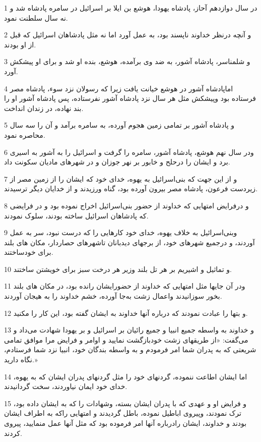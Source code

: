 \par 1 در سال دوازدهم آحاز، پادشاه یهودا، هوشع بن ایلا بر اسرائیل در سامره پادشاه شد و نه سال سلطنت نمود.
\par 2 و آنچه درنظر خداوند ناپسند بود، به عمل آورد اما نه مثل پادشاهان اسرائیل که قبل از او بودند.
\par 3 و شلمناسر، پادشاه آشور، به ضد وی برآمده، هوشع، بنده او شد و برای او پیشکش آورد.
\par 4 اماپادشاه آشور در هوشع خیانت یافت زیرا که رسولان نزد سوء، پادشاه مصر فرستاده بود وپیشکش مثل هر سال نزد پادشاه آشور نفرستاده، پس پادشاه آشور او را بند نهاده، در زندان انداخت.
\par 5 و پادشاه آشور بر تمامی زمین هجوم آورده، به سامره برآمد و آن را سه سال محاصره نمود.
\par 6 ودر سال نهم هوشع، پادشاه آشور، سامره را گرفت و اسرائیل را به آشور به اسیری برد و ایشان را درحلح و خابور بر نهر جوزان و در شهرهای مادیان سکونت داد.
\par 7 و از این جهت که بنی‌اسرائیل به یهوه، خدای خود که ایشان را از زمین مصر از زیردست فرعون، پادشاه مصر بیرون آورده بود، گناه ورزیدند و از خدایان دیگر ترسیدند.
\par 8 و درفرایض امتهایی که خداوند از حضور بنی‌اسرائیل اخراج نموده بود و در فرایضی که پادشاهان اسرائیل ساخته بودند، سلوک نمودند.
\par 9 وبنی‌اسرائیل به خلاف یهوه، خدای خود کارهایی را که درست نبود، سر به عمل آوردند، و درجمیع شهرهای خود، از برجهای دیدبانان تاشهرهای حصاردار، مکان های بلند برای خودساختند.
\par 10 و تماثیل و اشیریم بر هر تل بلند وزیر هر درخت سبز برای خویشتن ساختند.
\par 11 ودر آن جایها مثل امتهایی که خداوند از حضورایشان رانده بود، در مکان های بلند بخور سوزانیدند واعمال زشت به‌جا آورده، خشم خداوند را به هیجان آوردند.
\par 12 و بتها را عبادت نمودند که درباره آنها خداوند به ایشان گفته بود، این کار را مکنید.
\par 13 و خداوند به واسطه جمیع انبیا و جمیع رائیان بر اسرائیل و بر یهودا شهادت می‌داد و می‌گفت: «از طریقهای زشت خودبازگشت نمایید و اوامر و فرایض مرا موافق تمامی شریعتی که به پدران شما امر فرمودم و به واسطه بندگان خود، انبیا نزد شما فرستادم، نگاه دارید.»
\par 14 اما ایشان اطاعت ننموده، گردنهای خود را مثل گردنهای پدران ایشان که به یهوه، خدای خود ایمان نیاوردند، سخت گردانیدند.
\par 15 و فرایض او و عهدی که با پدران ایشان بسته، وشهادات را که به ایشان داده بود، ترک نمودند، وپیروی اباطیل نموده، باطل گردیدند و امتهایی راکه به اطراف ایشان بودند و خداوند، ایشان رادرباره آنها امر فرموده بود که مثل آنها عمل منمایید، پیروی کردند.
